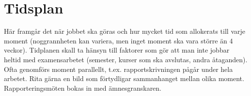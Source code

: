 \documentclass[12pt]{article}
\begin{document}
\section{Tidsplan}

Här framgår det när jobbet ska göras och hur mycket tid som allokerats till varje moment (noggrannheten kan variera, men inget moment ska vara större än 4 veckor). Tidplanen skall ta hänsyn till faktorer som gör att man inte jobbar heltid med examensarbetet (semester, kurser som ska avslutas, andra åtaganden). Ofta genomförs moment parallellt, t.ex. rapportskrivningen pågår under hela arbetet. Rita gärna en bild som förtydligar sammanhanget mellan olika moment. Rapporteringsmöten bokas in med ämnesgranskaren.
\end{document}
